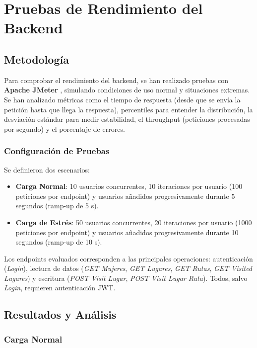 \section{Pruebas de Rendimiento del Backend}

\subsection{Metodología}

Para comprobar el rendimiento del backend, se han realizado pruebas con \textbf{Apache JMeter} \cite{apache_jmeter}, simulando condiciones de uso normal y situaciones extremas. Se han analizado métricas como el tiempo de respuesta (desde que se envía la petición hasta que llega la respuesta), percentiles para entender la distribución, la desviación estándar para medir estabilidad, el throughput (peticiones procesadas por segundo) y el porcentaje de errores.

\subsubsection{Configuración de Pruebas}

Se definieron dos escenarios:

\begin{itemize}
    \item \textbf{Carga Normal}: 10 usuarios concurrentes, 10 iteraciones por usuario (100 peticiones por endpoint) y usuarios añadidos progresivamente durante 5 segundos (ramp-up de 5 s).
    \item \textbf{Carga de Estrés}: 50 usuarios concurrentes, 20 iteraciones por usuario (1000 peticiones por endpoint) y usuarios añadidos progresivamente durante 10 segundos (ramp-up de 10 s).
\end{itemize}

Los endpoints evaluados corresponden a las principales operaciones: autenticación (\textit{Login}), lectura de datos (\textit{GET Mujeres}, \textit{GET Lugares}, \textit{GET Rutas}, \textit{GET Visited Lugares}) y escritura (\textit{POST Visit Lugar}, \textit{POST Visit Lugar Ruta}). Todos, salvo \textit{Login}, requieren autenticación JWT.

\subsection{Resultados y Análisis}

\subsubsection{Carga Normal}

